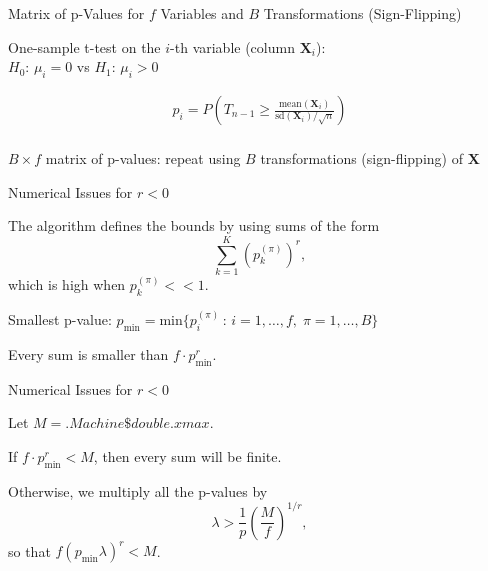 \documentclass[aspectratio=169]{beamer}
\begin{document}


\begin{frame}{Matrix of p-Values for $f$ Variables and $B$ Transformations (Sign-Flipping)}


One-sample t-test on the $i$-th variable (column $\mathbf{X}_i$):\\
$H_0:\,\mu_i=0$ vs $H_1:\,\mu_i>0$

\begin{align*}
p_i=P\left(T_{n-1}\geq \frac{\text{mean}(\mathbf{X}_i)}{\text{sd}(\mathbf{X}_i)/\sqrt{n}} \right)\\
\end{align*}

$B\times f$ matrix of p-values: repeat using $B$ transformations (sign-flipping) of $\mathbf{X}$
\end{frame}






\begin{frame}{Numerical Issues for $r<0$}

The algorithm defines the bounds by using sums of the form
\[\sum_{k=1}^K (p_k^{(\pi)})^r,\]
which is high when $p_k^{(\pi)}<<1$.


\vspace{3mm}
Smallest p-value: $p_{\text{min}}=\text{min}\{p_i^{(\pi)}\,:\,i=1,\ldots,f,\;\pi=1,\ldots,B \}$

Every sum is smaller than $f\cdot p_{\text{min}}^r$.
\end{frame}




\begin{frame}{Numerical Issues for $r<0$}

Let $M=.Machine\$double.xmax$.

\vspace{3mm}
If $f\cdot p_{\text{min}}^r < M$, then every sum will be finite.

\vspace{3mm}
Otherwise, we multiply all the p-values by
\[\lambda > \frac{1}{p}\left(\frac{M}{f}\right)^{1/r},\]
so that $f(p_{\text{min}}\lambda)^r < M$.
\end{frame}
\end{document}
